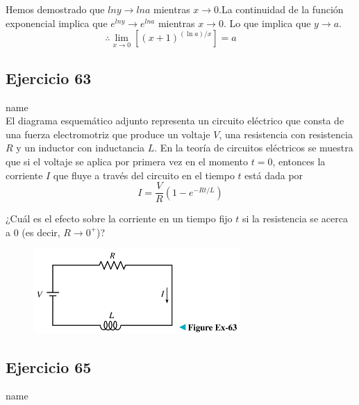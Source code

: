 \documentclass[12pt]{article}
\begin{document}
\begin{enumerate}[label=(\alph*)]
Hemos demostrado que $lny   \rightarrow lna $ mientras $x \rightarrow 0$.La continuidad de la función exponencial implica que $e^{lny}  \rightarrow e^{lna} $ mientras   $x \rightarrow 0$. Lo que implica que $y \rightarrow a $.
\[
\therefore
\lim_{x \to 0} [(x+1)^{(\ln a)/x}]=a \qquad
\]

\end{enumerate}

\subsection{Ejercicio 63} name \\

El diagrama esquemático adjunto representa un circuito eléctrico que consta de una fuerza electromotriz que produce un voltaje $V$, una resistencia con resistencia $R$ y un inductor con inductancia $L$. En la teoría de circuitos eléctricos se muestra que si el voltaje se aplica por primera vez en el momento $t = 0$, entonces la corriente $I$ que fluye a través del circuito en el tiempo $t$ está dada por
\[
I=\frac{V}{R}\left(1-e^{-Rt/L}\right)
\]

¿Cuál es el efecto sobre la corriente en un tiempo fijo $t$ si la resistencia se acerca a $0$ (es decir, $R\rightarrow 0^+$)?

\begin{figure}[H]
\centering
\includegraphics[width=0.7\textwidth]{../img/img_Lista3/circuit63.png}
\end{figure}

\subsection{Ejercicio 65} name \\
\end{document}
